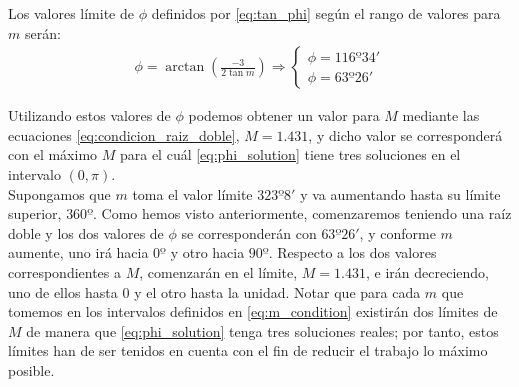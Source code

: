 \documentclass[11pt]{book}
\newcommand\ddfrac[2]{\frac{\displaystyle #1}{\displaystyle #2}}
\begin{document}
Los valores límite de $\phi$ definidos por \eqref{eq:tan_phi} según el rango de valores para $m$ serán:
\begin{align}
\phi=\arctan{(\ddfrac{-3}{2\tan{m}})} \Longrightarrow
\left\{
\begin{array}{l}
	\phi=116º34'\\
	\phi=63º26'
\end{array}
\right.
\end{align}

Utilizando estos valores de $\phi$ podemos obtener un valor para $M$ mediante las ecuaciones \eqref{eq:condicion_raiz_doble}, $M=1.431$, y dicho valor se corresponderá con el máximo $M$ para el cuál \eqref{eq:phi_solution} tiene tres soluciones en el intervalo $(0,\pi)$.\\

Supongamos que $m$ toma el valor límite $323º8'$ y va aumentando hasta su límite superior, $360º$. Como hemos visto anteriormente, comenzaremos teniendo una raíz doble y los dos valores de $\phi$ se corresponderán con $63º26'$, y conforme $m$ aumente, uno irá hacia $0º$ y otro hacia $90º$. Respecto a los dos valores correspondientes a $M$, comenzarán en el límite, $M=1.431$, e irán decreciendo, uno de ellos hasta $0$ y el otro hasta la unidad. Notar que para cada $m$ que tomemos en los intervalos definidos en \eqref{eq:m_condition} existirán dos límites de $M$ de manera que \eqref{eq:phi_solution} tenga tres soluciones reales; por tanto, estos límites han de ser tenidos en cuenta con el fin de reducir el trabajo lo máximo posible.\\




\newpage
\end{document}
